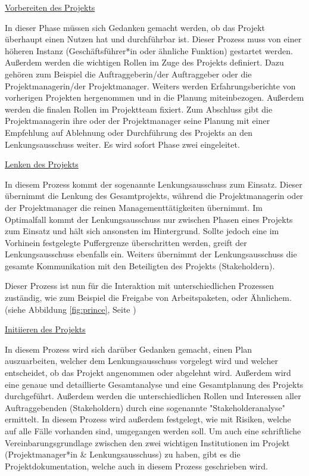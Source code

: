 \underline{Vorbereiten des Projekts}

In dieser Phase müssen sich Gedanken gemacht werden, ob das Projekt überhaupt einen Nutzen hat und durchführbar ist. Dieser Prozess muss von einer höheren Instanz (Geschäftsführer*in oder ähnliche Funktion) gestartet werden. Außerdem werden die wichtigen Rollen im Zuge des Projekts definiert. Dazu gehören zum Beispiel die Auftraggeberin/der Auftraggeber oder die Projektmanagerin/der Projektmanager. Weiters werden Erfahrungsberichte von vorherigen Projekten hergenommen und in die Planung miteinbezogen. Außerdem werden die finalen Rollen im Projektteam fixiert. Zum Abschluss gibt die Projektmanagerin ihre oder der Projektmanager seine Planung mit einer Empfehlung auf Ablehnung oder Durchführung des Projekts an den Lenkungsausschuss weiter. Es wird sofort Phase zwei eingeleitet. \cite{Prince2}

\underline{Lenken des Projekts}

In diesem Prozess kommt der sogenannte Lenkungsausschuss zum Einsatz. Dieser übernimmt die Lenkung des Gesamtprojekts, während die Projektmanagerin oder der Projektmanager die reinen Managementtätigkeiten übernimmt. Im Optimalfall kommt der Lenkungsausschuss nur zwischen Phasen eines Projekts zum Einsatz und hält sich ansonsten im Hintergrund. Sollte jedoch eine im Vorhinein festgelegte Puffergrenze überschritten werden, greift der Lenkungsausschuss ebenfalls ein. Weiters übernimmt der Lenkungsausschuss die gesamte Kommunikation mit den Beteiligten des Projekts (Stakeholdern). \cite{Prince2}

Dieser Prozess ist nun für die Interaktion mit unterschiedlichen Prozessen zuständig, wie zum Beispiel die Freigabe von Arbeitspaketen, oder Ähnlichem. (siehe Abbildung \ref{fig:prince}, Seite \pageref{fig:prince}) \cite{Prince2}

\underline{Initiieren des Projekts}

In diesem Prozess wird sich darüber Gedanken gemacht, einen Plan auszuarbeiten, welcher dem Lenkungsausschuss vorgelegt wird und welcher entscheidet, ob das Projekt angenommen oder abgelehnt wird. Außerdem wird eine genaue und detaillierte Gesamtanalyse und eine Gesamtplanung des Projekts durchgeführt. Außerdem werden die unterschiedlichen Rollen und Interessen aller Auftraggebenden (Stakeholdern) durch eine sogenannte "Stakeholderanalyse" ermittelt. In diesem Prozess wird außerdem festgelegt, wie mit Risiken, welche auf alle Fälle vorhanden sind, umgegangen werden soll. Um auch eine schriftliche Vereinbarungsgrundlage zwischen den zwei wichtigen Institutionen im Projekt (Projektmanager*in \& Lenkungsausschuss) zu haben, gibt es die Projektdokumentation, welche auch in diesem Prozess geschrieben wird. \cite{Prince2} \cite{Stakeholder}

